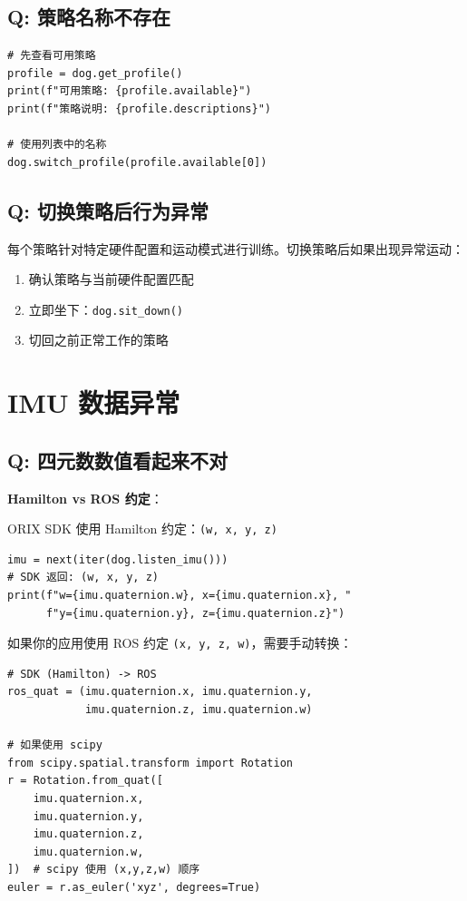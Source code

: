 \documentclass[a4paper,11pt,openany]{book}
\begin{document}
\subsection{Q: 策略名称不存在}

\begin{lstlisting}[style=python]
# 先查看可用策略
profile = dog.get_profile()
print(f"可用策略: {profile.available}")
print(f"策略说明: {profile.descriptions}")

# 使用列表中的名称
dog.switch_profile(profile.available[0])
\end{lstlisting}

\subsection{Q: 切换策略后行为异常}

每个策略针对特定硬件配置和运动模式进行训练。切换策略后如果出现异常运动：
\begin{enumerate}[nosep]
  \item 确认策略与当前硬件配置匹配
  \item 立即坐下：\texttt{dog.sit\_down()}
  \item 切回之前正常工作的策略
\end{enumerate}

\section{IMU 数据异常}

\subsection{Q: 四元数数值看起来不对}

\noindent\textbf{Hamilton vs ROS 约定}：

ORIX SDK 使用 Hamilton 约定：\texttt{(w, x, y, z)}

\begin{lstlisting}[style=python]
imu = next(iter(dog.listen_imu()))
# SDK 返回: (w, x, y, z)
print(f"w={imu.quaternion.w}, x={imu.quaternion.x}, "
      f"y={imu.quaternion.y}, z={imu.quaternion.z}")
\end{lstlisting}

如果你的应用使用 ROS 约定 \texttt{(x, y, z, w)}，需要手动转换：

\begin{lstlisting}[style=python]
# SDK (Hamilton) -> ROS
ros_quat = (imu.quaternion.x, imu.quaternion.y,
            imu.quaternion.z, imu.quaternion.w)

# 如果使用 scipy
from scipy.spatial.transform import Rotation
r = Rotation.from_quat([
    imu.quaternion.x,
    imu.quaternion.y,
    imu.quaternion.z,
    imu.quaternion.w,
])  # scipy 使用 (x,y,z,w) 顺序
euler = r.as_euler('xyz', degrees=True)
\end{lstlisting}
\end{document}
